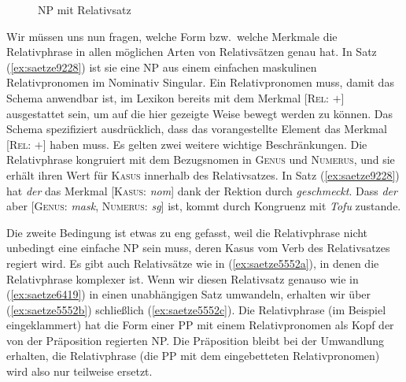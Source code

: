 \begin{figure}
  \centering
  \vspace{0.3cm}
  \caption{NP mit Relativsatz}
  \label{fig:saetze9228}
\end{figure}


Wir müssen uns nun fragen, welche Form bzw.\ welche Merkmale die Relativphrase in allen möglichen Arten von Relativsätzen genau hat.
In Satz (\ref{ex:saetze9228}) ist sie eine NP aus einem einfachen maskulinen Relativpronomen im Nominativ Singular.
Ein Relativpronomen muss, damit das Schema anwendbar ist, im Lexikon bereits mit dem Merkmal [\textsc{Rel}: $+$] ausgestattet sein, um auf die hier gezeigte Weise bewegt werden zu können.
Das Schema spezifiziert ausdrücklich, dass das vorangestellte Element das Merkmal [\textsc{Rel}: $+$] haben muss.
Es gelten zwei weitere wichtige Beschränkungen.
Die Relativphrase kongruiert mit dem Bezugsnomen in \textsc{Genus} und \textsc{Numerus}, und sie erhält ihren Wert für \textsc{Kasus} innerhalb des Relativsatzes.
In Satz (\ref{ex:saetze9228}) hat \textit{der} das Merkmal [\textsc{Kasus}: \textit{nom}] dank der Rektion durch \textit{geschmeckt}.
Dass \textit{der} aber [\textsc{Genus}: \textit{mask}, \textsc{Numerus}: \textit{sg}] ist, kommt durch Kongruenz mit \textit{Tofu} zustande.

Die zweite Bedingung ist etwas zu eng gefasst, weil die Relativphrase nicht unbedingt eine einfache NP sein muss, deren Kasus vom Verb des Relativsatzes regiert wird.
Es gibt auch Relativsätze wie in (\ref{ex:saetze5552a}), in denen die Relativphrase komplexer ist.
Wenn wir diesen Relativsatz genauso wie in (\ref{ex:saetze6419}) in einen unabhängigen Satz umwandeln, erhalten wir über (\ref{ex:saetze5552b}) schließlich (\ref{ex:saetze5552c}).
Die Relativphrase (im Beispiel eingeklammert) hat die Form einer PP mit einem Relativpronomen als Kopf der von der Präposition regierten NP.
Die Präposition bleibt bei der Umwandlung erhalten, die Relativphrase (die PP mit dem eingebetteten Relativpronomen) wird also nur teilweise ersetzt.

